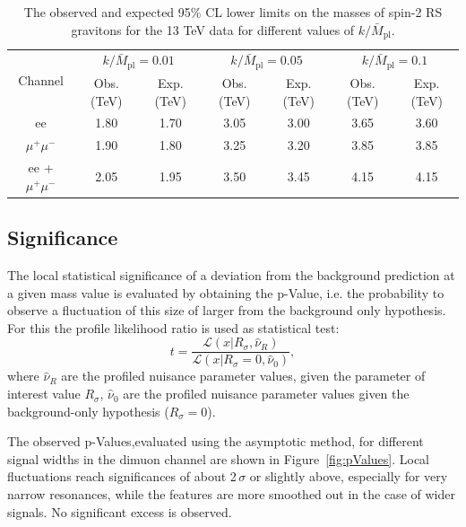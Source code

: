  \begin{table}[!hbt]
\begin{center} 
\caption{The observed and expected 95\% CL lower limits on the masses of spin-2 RS gravitons for the 13 TeV data for different values of $k/\bar{M}_{\mathrm{pl}}$.}
\begin{tabular}{ccccccc} 
\multirow{2}{*}{Channel}  & \multicolumn{2}{c}{$k/\bar{M}_{\mathrm{pl}} = 0.01$} & \multicolumn{2}{c}{$k/\bar{M}_{\mathrm{pl}} = 0.05$}  & \multicolumn{2}{c}{$k/\bar{M}_{\mathrm{pl}} = 0.1$}\\
                          & Obs. (TeV) & Exp. (TeV)      & Obs. (TeV)  & Exp. (TeV)   & Obs. (TeV)  & Exp. (TeV)      \\\hline
ee                        &  1.80      & 1.70            & 3.05        & 3.00   & 3.65 & 3.60          \\ 
$\mu^+\mu^-$              &  1.90      & 1.80            & 3.25        & 3.20   &  3.85  &  3.85        \\
ee + $\mu^+\mu^-$         &  2.05      & 1.95            & 3.50        & 3.45    & 4.15  & 4.15        \\
\end{tabular}  
\label{tab:massLimitsSpin2}
\end{center} 
\end{table} 

\subsection{Significance}
The local statistical significance of a deviation from the background prediction at a given mass value is evaluated by obtaining the p-Value, i.e. the probability to observe a fluctuation of this size of larger from the background only hypothesis. For this the profile likelihood ratio is used as statistical test:
\begin{equation}
\label{eq:plr}
t = \frac{\mathcal{L}(x|R_\sigma, \hat{\nu}_R)}{\mathcal{L}(x|R_\sigma=0, \hat{\nu}_0)},
\end{equation}
where
$\hat{\nu}_R$ are the profiled nuisance parameter values, given the parameter of interest value $R_\sigma$, $\hat{\nu}_0$ are the profiled nuisance parameter values given the background-only hypothesis ($R_\sigma=0$).

The observed p-Values,evaluated using the asymptotic method, for different signal widths in the dimuon channel are shown in Figure~\ref{fig:pValues}. Local fluctuations reach significances of about 2\,$\sigma$ or slightly above, especially for very narrow resonances, while the features are more smoothed out in the case of wider signals. No significant excess is observed.

